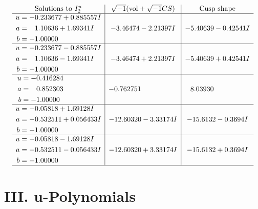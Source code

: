 \documentclass[1p]{elsarticle_modified}
\theoremstyle{definition}
\newcommand{\I}{\sqrt{-1}}
\begin{document}
$$\begin{array}{c|c|c}  
\text{Solutions to }I^u_{2}& \I (\text{vol} + \sqrt{-1}CS) & \text{Cusp shape}\\
 \hline 
\begin{aligned}
u &= -0.233677 + 0.885557 I \\
a &= \phantom{-}1.10636 + 1.69341 I \\
b &= -1.00000\phantom{ +0.000000I}\end{aligned}
 & -3.46474 - 2.21397 I & -5.40639 - 0.42541 I \\ \hline\begin{aligned}
u &= -0.233677 - 0.885557 I \\
a &= \phantom{-}1.10636 - 1.69341 I \\
b &= -1.00000\phantom{ +0.000000I}\end{aligned}
 & -3.46474 + 2.21397 I & -5.40639 + 0.42541 I \\ \hline\begin{aligned}
u &= -0.416284\phantom{ +0.000000I} \\
a &= \phantom{-}0.852303\phantom{ +0.000000I} \\
b &= -1.00000\phantom{ +0.000000I}\end{aligned}
 & -0.762751\phantom{ +0.000000I} & \phantom{-}8.03930\phantom{ +0.000000I} \\ \hline\begin{aligned}
u &= -0.05818 + 1.69128 I \\
a &= -0.532511 + 0.056433 I \\
b &= -1.00000\phantom{ +0.000000I}\end{aligned}
 & -12.60320 - 3.33174 I & -15.6132 - 0.3694 I \\ \hline\begin{aligned}
u &= -0.05818 - 1.69128 I \\
a &= -0.532511 - 0.056433 I \\
b &= -1.00000\phantom{ +0.000000I}\end{aligned}
 & -12.60320 + 3.33174 I & -15.6132 + 0.3694 I\\
 \hline 
 \end{array}$$\newpage
\newpage\renewcommand{\arraystretch}{1}
\centering \section*{ III. u-Polynomials}
\end{document}
